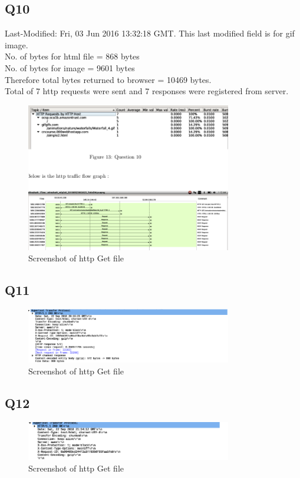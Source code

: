 \documentclass{article}
\begin{document}
\subsection{Q10}
Last-Modified: Fri, 03 Jun 2016 13:32:18 GMT. This last modified field is for gif image.\\
No. of bytes for html file = 868 bytes\\
No. of bytes for image = 9601 bytes\\
Therefore total bytes returned to browser = 10469 bytes.\\
Total of 7 http requests were sent and 7 responses were registered from server.\\
  \begin{figure}[H]
 \centering
 \includegraphics[width=0.8\textwidth]{../Set1/q10/a.png}
 \caption{\label{fig:PING}Screenshot of http Get file}
 \end{figure}
\subsection{Q11}
  \begin{figure}[H]
 \centering
 \includegraphics[width=0.8\textwidth]{../Set1/q11/a.png}
 \caption{\label{fig:PING}Screenshot of http Get file}
 \end{figure}
\subsection{Q12}
  \begin{figure}[H]
 \centering
 \includegraphics[width=0.8\textwidth]{../Set1/q12/a.png}
 \caption{\label{fig:PING}Screenshot of http Get file}
 \end{figure}
 
\end{document}
